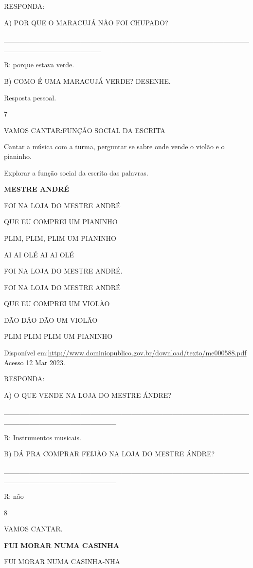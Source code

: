 {{{{{{RESPONDA:

A) POR QUE O MARACUJÁ NÃO FOI CHUPADO?

\_\_\_\_\_\_\_\_\_\_\_\_\_\_\_\_\_\_\_\_\_\_\_\_\_\_\_\_\_\_\_\_\_\_\_\_\_\_\_\_\_\_\_\_\_\_\_\_\_\_\_\_\_\_\_\_\_\_\_\_\_\_\_\_\_\_\_

R: porque estava verde.

B) COMO É UMA MARACUJÁ VERDE? DESENHE.

Resposta pessoal.

\num{7}

VAMOS CANTAR:FUNÇÃO SOCIAL DA ESCRITA

Cantar a música com a turma, perguntar se sabre onde vende o violão e o
pianinho.

Explorar a função social da escrita das palavras.

\textbf{MESTRE ANDRÉ}

FOI NA LOJA DO MESTRE ANDRÉ

QUE EU COMPREI UM PIANINHO

PLIM, PLIM, PLIM UM PIANINHO

AI AI OLÉ AI AI OLÉ

FOI NA LOJA DO MESTRE ANDRÉ.

FOI NA LOJA DO MESTRE ANDRÉ

QUE EU COMPREI UM VIOLÃO

DÃO DÃO DÃO UM VIOLÃO

PLIM PLIM PLIM UM PIANINHO

Disponível
em:\url{http://www.dominiopublico.gov.br/download/texto/me000588.pdf}
Acesso 12 Mar 2023.

RESPONDA:

A) O QUE VENDE NA LOJA DO MESTRE ÁNDRE?

\_\_\_\_\_\_\_\_\_\_\_\_\_\_\_\_\_\_\_\_\_\_\_\_\_\_\_\_\_\_\_\_\_\_\_\_\_\_\_\_\_\_\_\_\_\_\_\_\_\_\_\_\_\_\_\_\_\_\_\_\_\_\_\_\_\_\_\_\_\_

R: Instrumentos musicais.

B) DÁ PRA COMPRAR FEIJÃO NA LOJA DO MESTRE ÁNDRE?

\_\_\_\_\_\_\_\_\_\_\_\_\_\_\_\_\_\_\_\_\_\_\_\_\_\_\_\_\_\_\_\_\_\_\_\_\_\_\_\_\_\_\_\_\_\_\_\_\_\_\_\_\_\_\_\_\_\_\_\_\_\_\_\_\_\_\_\_\_\_

R: não

\num{8}

VAMOS CANTAR.

\textbf{FUI MORAR NUMA CASINHA}

FUI MORAR NUMA CASINHA-NHA

}}}}}}
